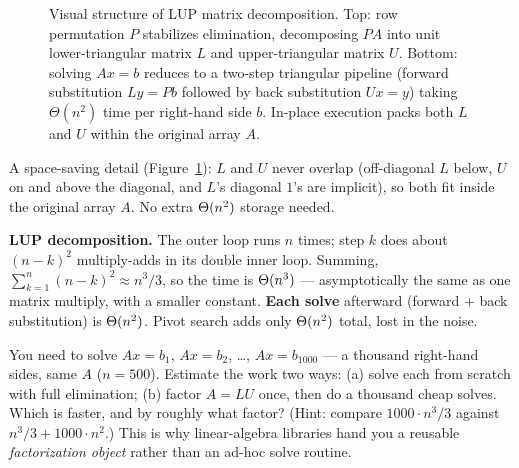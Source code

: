 \begin{figure}[h]
\caption{Visual structure of LUP matrix decomposition. Top: row permutation $P$ stabilizes elimination, decomposing $PA$ into unit lower-triangular matrix $L$ and upper-triangular matrix $U$. Bottom: solving $Ax=b$ reduces to a two-step triangular pipeline (forward substitution $Ly=Pb$ followed by back substitution $Ux=y$) taking $\Theta(n^2)$ time per right-hand side $b$. In-place execution packs both $L$ and $U$ within the original array $A$.}
\label{ch27:lupack}
\end{figure}

A space-saving detail (Figure~\ref{ch27:lupack}): $L$ and $U$ never overlap
(off-diagonal $L$ below, $U$ on and above the diagonal, and $L$'s diagonal $1$'s
are implicit), so both fit inside the original array $A$. No extra $\Theta(n^2)$
storage needed.

\begin{complexitybox}
\textbf{LUP decomposition.} The outer loop runs $n$ times; step $k$ does about
$(n-k)^2$ multiply-adds in its double inner loop. Summing,
$\sum_{k=1}^{n}(n-k)^2\approx n^3/3$, so the time is $\Theta(n^3)$ ---
asymptotically the same as one matrix multiply, with a smaller constant.
\textbf{Each solve} afterward (forward + back substitution) is $\Theta(n^2)$.
Pivot search adds only $\Theta(n^2)$ total, lost in the noise.
\end{complexitybox}

\begin{walkbox}
You need to solve $Ax=b_1$, $Ax=b_2$, \dots, $Ax=b_{1000}$ --- a thousand
right-hand sides, same $A$ ($n=500$). Estimate the work two ways: (a) solve each
from scratch with full elimination; (b) factor $A=LU$ once, then do a thousand
cheap solves. Which is faster, and by roughly what factor? (Hint: compare
$1000\cdot n^3/3$ against $n^3/3 + 1000\cdot n^2$.) This is why
linear-algebra libraries hand you a reusable \emph{factorization object} rather than
an ad-hoc solve routine.
\end{walkbox}

